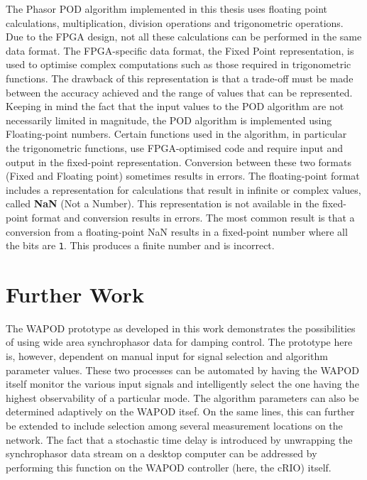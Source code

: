 \documentclass[journal]{IEEEtran}
\begin{document}
The Phasor POD algorithm implemented in this thesis uses floating point calculations, multiplication, division operations and  trigonometric operations. Due to the FPGA design, not all these calculations can be performed in the same data format. The FPGA-specific data format, the Fixed Point representation, is used to optimise complex computations such as those required in trigonometric functions. The drawback of this representation is that a trade-off must be made between the accuracy achieved and the range of values that can be represented. Keeping in mind the fact that the input values to the POD algorithm are not necessarily limited in magnitude, the POD algorithm is implemented using Floating-point numbers. Certain functions used in the algorithm, in particular the trigonometric functions, use FPGA-optimised code and require input and output in the fixed-point representation. Conversion between these two formats (Fixed and Floating point) sometimes results in errors. The floating-point format includes a representation for calculations that result in infinite or complex values, called \textbf{NaN} (Not a Number)\cite{LabVIEWCourse}. This representation is not available in the fixed-point format and conversion results in errors. The most common result is that a conversion from a floating-point NaN results in a fixed-point number where all the bits are \texttt{1}. This produces a finite number and is incorrect.\\ 


\section{Further Work}\label{Future}

The WAPOD prototype as developed in this work demonstrates the possibilities of using wide area synchrophasor data for damping control. The prototype here is, however, dependent on manual input for signal selection and algorithm parameter values. These two processes can be automated by having the WAPOD itself monitor the various input signals and intelligently select the one having the highest observability of a particular mode. The algorithm parameters can also be determined adaptively on the WAPOD itsef. On the same lines, this can further be extended to include selection among several measurement locations on the network. The fact that a stochastic time delay is introduced by unwrapping the synchrophasor data stream on a desktop computer can be addressed by performing this function on the WAPOD controller (here, the cRIO) itself.
\end{document}
